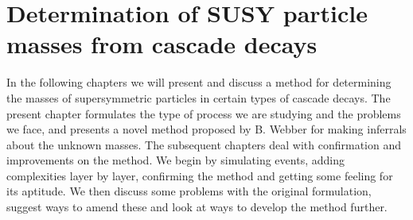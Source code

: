 \documentclass[twoside,english]{uiofysmaster}
\begin{document}





\chapter{Determination of SUSY particle masses from cascade decays}
In the following chapters we will present and discuss a method for determining the masses of supersymmetric particles in certain types of cascade decays. The present chapter formulates the type of process we are studying and the problems we face, and presents a novel method proposed by B. Webber \cite{Webber:2009vm} for making inferrals about the unknown masses. The subsequent chapters deal with confirmation and improvements on the method. We begin by simulating events, adding complexities layer by layer, confirming the method and getting some feeling for its aptitude. We then discuss some problems with the original formulation, suggest ways to amend these and look at ways to develop the method further.
\end{document}
